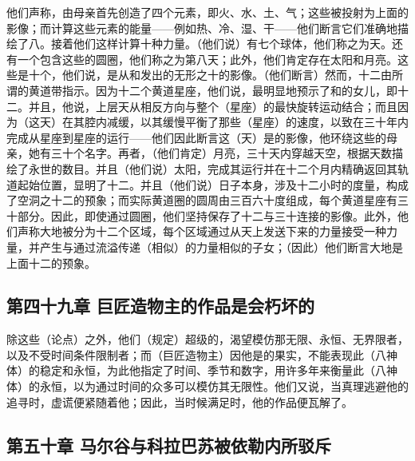 他们声称，由母亲首先创造了四个元素，即火、水、土、气；这些被投射为上面的影像；而计算这些元素的能量——例如热、冷、湿、干——他们断言它们准确地描绘了八。接着他们这样计算十种力量。（他们说）有七个球体，他们称之为天。还有一个包含这些的圆圈，他们称之为第八天；此外，他们肯定存在太阳和月亮。这些是十个，他们说，是从和发出的无形之十的影像。（他们断言）然而，十二由所谓的黄道带指示。因为十二个黄道星座，他们说，最明显地预示了和的女儿，即十二。并且，他说，上层天从相反方向与整个（星座）的最快旋转运动结合；而且因为（这天）在其腔内减缓，以其缓慢平衡了那些（星座）的速度，以致在三十年内完成从星座到星座的运行——他们因此断言这（天）是的影像，他环绕这些的母亲，她有三十个名字。再者，（他们肯定）月亮，三十天内穿越天空，根据天数描绘了永世的数目。并且（他们说）太阳，完成其运行并在十二个月内精确返回其轨道起始位置，显明了十二。并且（他们说）日子本身，涉及十二小时的度量，构成了空洞之十二的预象；而实际黄道圈的圆周由三百六十度组成，每个黄道星座有三十部分。因此，即使通过圆圈，他们坚持保存了十二与三十连接的影像。此外，他们声称大地被分为十二个区域，每个区域通过从天上发送下来的力量接受一种力量，并产生与通过流溢传递（相似）的力量相似的子女；（因此）他们断言大地是上面十二的预象。\par


\subsection{第四十九章 巨匠造物主的作品是会朽坏的}

除这些（论点）之外，他们（规定）超级的，渴望模仿那无限、永恒、无界限者，以及不受时间条件限制者；而（巨匠造物主）因他是的果实，不能表现此（八神体）的稳定和永恒，为此他指定了时间、季节和数字，用许多年来衡量此（八神体）的永恒，以为通过时间的众多可以模仿其无限性。他们又说，当真理逃避他的追寻时，虚谎便紧随着他；因此，当时候满足时，他的作品便瓦解了。\par


\subsection{第五十章 马尔谷与科拉巴苏被依勒内所驳斥}

